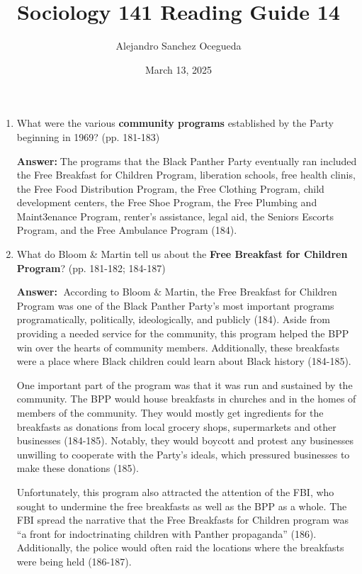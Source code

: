 \documentclass{article}
\title{Sociology 141 Reading Guide 14}
\author{Alejandro Sanchez Ocegueda}
\date{March 13, 2025}
\newcommand{\answer}{\textbf{Answer:}$\;$}
\begin{document}
\maketitle

\begin{enumerate}[label=\arabic*)]
    \item What were the various \textbf{community programs} established by the Party beginning in 1969? (pp. 181-183)
    
    \answer The programs that the Black Panther Party eventually ran included the Free Breakfast for Children Program, liberation schools, free health clinis, the Free Food Distribution Program, the Free Clothing Program, child development centers, the Free Shoe Program, the Free Plumbing and Maint3enance Program, renter's assistance, legal aid, the Seniors Escorts Program, and the Free Ambulance Program (184).
    
    \item What do Bloom \& Martin tell us about the \textbf{Free Breakfast for Children Program}? (pp. 181-182; 184-187)
    
    \answer 
    According to Bloom \& Martin, the Free Breakfast for Children Program was one of the Black Panther Party's most important programs programatically, politically, ideologically, and publicly (184).
    Aside from providing a needed service for the community, this program helped the BPP win over the hearts of community members.
    Additionally, these breakfasts were a place where Black children could learn about Black history (184-185).
    
    One important part of the program was that it was run and sustained by the community.
    The BPP would house breakfasts in churches and in the homes of members of the community.
    They would mostly get ingredients for the breakfasts as donations from local grocery shops, supermarkets and other businesses (184-185).
    Notably, they would boycott and protest any businesses unwilling to cooperate with the Party's ideals, which pressured businesses to make these donations (185).

    Unfortunately, this program also attracted the attention of the FBI, who sought to undermine the free breakfasts as well as the BPP as a whole.
    The FBI spread the narrative that the Free Breakfasts for Children program was ``a front for indoctrinating children with Panther propaganda'' (186).
    Additionally, the police would often raid the locations where the breakfasts were being held (186-187).
    

\end{enumerate}
\end{document}
